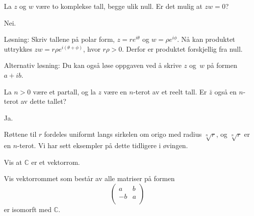 \begin{oppgave}
La $z$ og $w$ være to komplekse tall, begge ulik null. Er det mulig at $zw=0$?
\end{oppgave}

\begin{losning}
Nei.

\noindent
Løsning: Skriv tallene på polar form, $z=re^{i\theta}$ og $w=\rho e^{i\phi}$. Nå kan produktet uttrykkes $zw=r\rho e^{i(\theta+\phi)}$, hvor $r \rho>0$. Derfor er produktet forskjellig fra null.

\noindent
Alternativ løsning: Du kan også løse oppgaven ved å skrive $z$ og~$w$ på formen $a+ib$.
\end{losning}



\begin{oppgave}
La $n>0$ være et partall, og la $z$ være en $n$-terot av et reelt tall. Er $\bar{z}$ også en $n$-terot av dette tallet?
\end{oppgave}

\begin{losning}
Ja.

\noindent
Røttene til $r$ fordeles uniformt langs sirkelen om origo med radius $\sqrt[n]{r}$, og $\sqrt[n]{r}$ er en $n$-terot. Vi har sett eksempler på dette tidligere i øvingen.
\end{losning}

\begin{oppgave}
Vis at $\mathbb C$ er et vektorrom.
\end{oppgave}

\begin{oppgave}
Vis vektorrommet som består av alle matriser på formen 
\[
\begin{pmatrix}
a & b \\
-b & a \\
\end{pmatrix}
\]
er isomorft med $\mathbb C$. 
\end{oppgave}


